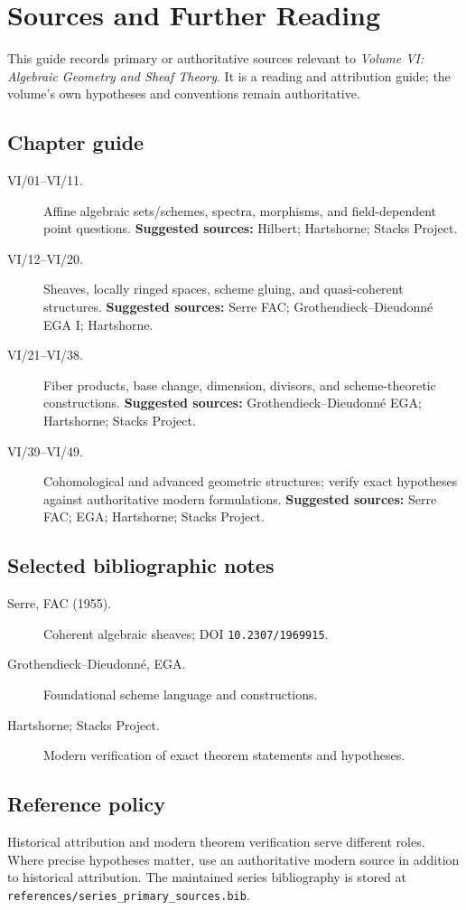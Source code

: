 \chapter*{Sources and Further Reading}
{}

This guide records primary or authoritative sources relevant to \emph{Volume VI: Algebraic Geometry and Sheaf Theory}.
It is a reading and attribution guide; the volume's own hypotheses and conventions remain authoritative.

\section*{Chapter guide}
\begin{description}
\item[VI/01--VI/11.] Affine algebraic sets/schemes, spectra, morphisms, and field-dependent point questions.
\textbf{Suggested sources:} Hilbert; Hartshorne; Stacks Project.

\item[VI/12--VI/20.] Sheaves, locally ringed spaces, scheme gluing, and quasi-coherent structures.
\textbf{Suggested sources:} Serre FAC; Grothendieck--Dieudonné EGA I; Hartshorne.

\item[VI/21--VI/38.] Fiber products, base change, dimension, divisors, and scheme-theoretic constructions.
\textbf{Suggested sources:} Grothendieck--Dieudonné EGA; Hartshorne; Stacks Project.

\item[VI/39--VI/49.] Cohomological and advanced geometric structures; verify exact hypotheses against authoritative modern formulations.
\textbf{Suggested sources:} Serre FAC; EGA; Hartshorne; Stacks Project.

\end{description}

\section*{Selected bibliographic notes}
\begin{description}
\item[Serre, FAC (1955).] Coherent algebraic sheaves; DOI \texttt{10.2307/1969915}.

\item[Grothendieck--Dieudonné, EGA.] Foundational scheme language and constructions.

\item[Hartshorne; Stacks Project.] Modern verification of exact theorem statements and hypotheses.

\end{description}

\section*{Reference policy}
Historical attribution and modern theorem verification serve different roles.
Where precise hypotheses matter, use an authoritative modern source in addition to historical attribution.
The maintained series bibliography is stored at \texttt{references/series\_primary\_sources.bib}.
